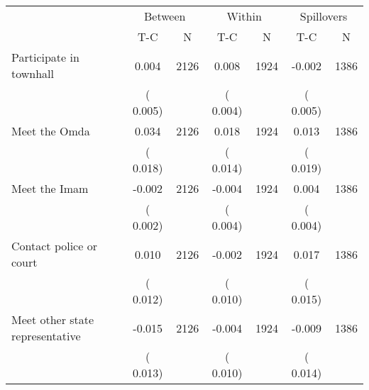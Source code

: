 
\begin{tabular}{l*{6}{c}}\hline&\multicolumn{2}{c}{Between}&\multicolumn{2}{c}{Within}&\multicolumn{2}{c}{Spillovers} \\ \cmidrule(r){2-3}\cmidrule(l){4-5}\cmidrule(l){6-7} & {T-C} & {N} & {T-C} & {N}  & {T-C}  & {N}  \\ \midrule
Participate in townhall        &              0.004      &       2126       &              0.008      &       1924       &             -0.002      &       1386       \\
                       &       (       0.005)            &                               &       (       0.004)            &                               &       (       0.005)            &                               \\
Meet the Omda        &              0.034      &       2126       &              0.018      &       1924       &              0.013      &       1386       \\
                       &       (       0.018)            &                               &       (       0.014)            &                               &       (       0.019)            &                               \\
Meet the Imam        &             -0.002      &       2126       &             -0.004      &       1924       &              0.004      &       1386       \\
                       &       (       0.002)            &                               &       (       0.004)            &                               &       (       0.004)            &                               \\
Contact police or court        &              0.010      &       2126       &             -0.002      &       1924       &              0.017      &       1386       \\
                       &       (       0.012)            &                               &       (       0.010)            &                               &       (       0.015)            &                               \\
Meet other state representative        &             -0.015      &       2126       &             -0.004      &       1924       &             -0.009      &       1386       \\
                       &       (       0.013)            &                               &       (       0.010)            &                               &       (       0.014)            &                               \\

\end{tabular}
